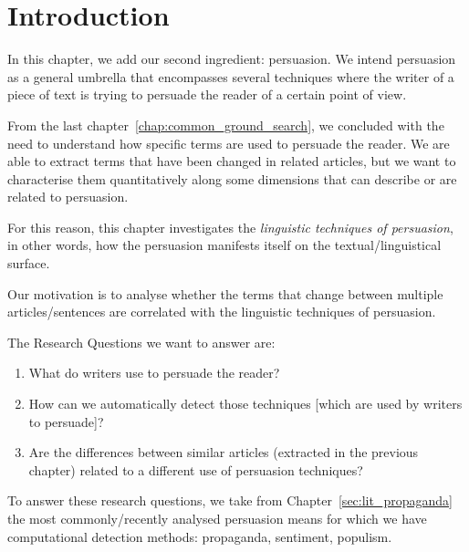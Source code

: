 \label{chap:linguistic_persuasion}

\section{\statusgreen Introduction}
\label{sec:lp_intro}

In this chapter, we add our second ingredient: persuasion.
We intend persuasion as a general umbrella that encompasses several techniques where the writer of a piece of text is trying to persuade the reader of a certain point of view.

From the last chapter~\ref{chap:common_ground_search}, we concluded with the need to understand how specific terms are used to persuade the reader. We are able to extract terms that have been changed in related articles, but we want to characterise them quantitatively along some dimensions that can describe or are related to persuasion.

For this reason, this chapter investigates the \emph{linguistic techniques of persuasion}, in other words, how the persuasion manifests itself on the textual/linguistical surface.

Our motivation is to analyse whether the terms that change between multiple articles/sentences are correlated with the linguistic techniques of persuasion.

The Research Questions we want to answer are: 
\begin{enumerate}
    \item What do writers use to persuade the reader?
    \item How can we automatically detect those techniques [which are used by writers to persuade]? %
    \item Are the differences between similar articles (extracted in the previous chapter) related to a different use of persuasion techniques? %
\end{enumerate}



To answer these research questions, we take from Chapter~\ref{sec:lit_propaganda} the most commonly/recently analysed \gls{persuasion} means for which we have computational detection methods: \gls{propaganda}, \gls{sentiment}, populism.

